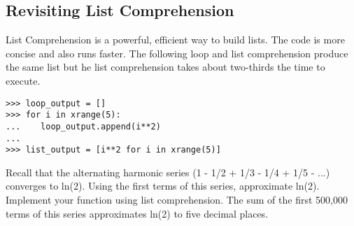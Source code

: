 
\subsection*{Revisiting List Comprehension}
List Comprehension is a powerful, efficient way to build lists.  The code is more concise and also runs faster.  The following  loop and list comprehension produce the same list but he list comprehension takes about two-thirds the time to execute.

\begin{lstlisting}
>>> loop_output = []
>>> for i in xrange(5):
...    loop_output.append(i**2)
...
>>> list_output = [i**2 for i in xrange(5)]
\end{lstlisting}

\begin{problem}
Recall that the alternating harmonic series (1 - 1/2 + 1/3 - 1/4 + 1/5 - ...) converges to ln(2). Using the first  terms of this series, approximate ln(2).  Implement your function using list comprehension.  The sum of the first 500,000 terms of this series approximates ln(2) to five decimal places.
\end{problem}

\begin{comment}
\section*{Specifications}
We suggest that you submit your solutions in a file called \li{solutions.py}, using the following format.

\end{comment}
